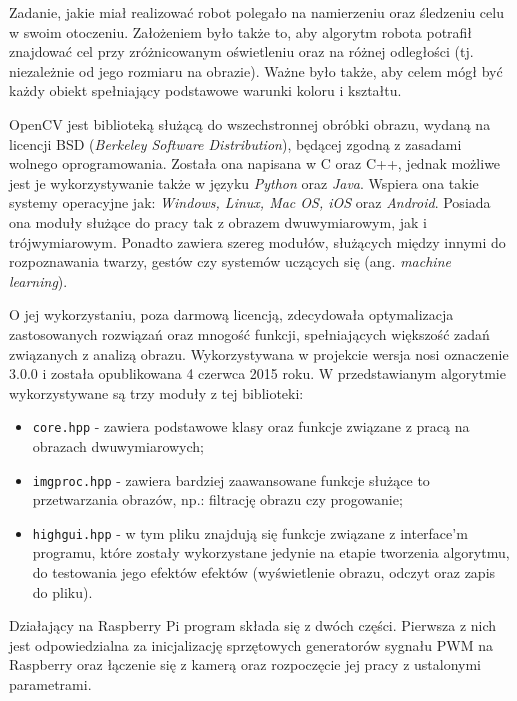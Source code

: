 Zadanie, jakie miał realizować robot polegało na namierzeniu oraz śledzeniu celu w swoim otoczeniu. Założeniem było także to, aby algorytm robota potrafił znajdować cel przy zróżnicowanym oświetleniu oraz na różnej odległości (tj. niezależnie od jego rozmiaru na obrazie). Ważne było także, aby celem mógł być każdy obiekt spełniający podstawowe warunki koloru i kształtu.

OpenCV jest biblioteką służącą do wszechstronnej obróbki obrazu, wydaną na licencji BSD (\textit{Berkeley Software Distribution}), będącej zgodną z zasadami wolnego oprogramowania. Została ona napisana w C oraz C++, jednak możliwe jest je wykorzystywanie także w języku \textit{Python} oraz \textit{Java}. Wspiera ona takie systemy operacyjne jak: \textit{Windows, Linux, Mac OS, iOS} oraz \textit{Android}. Posiada ona moduły służące do pracy tak z obrazem dwuwymiarowym, jak i trójwymiarowym. Ponadto zawiera szereg modułów, służących między innymi do rozpoznawania twarzy, gestów czy systemów uczących się (ang. \textit{machine learning}).

O jej wykorzystaniu, poza darmową licencją, zdecydowała optymalizacja zastosowanych rozwiązań oraz mnogość funkcji, spełniających większość zadań związanych z analizą obrazu. Wykorzystywana w projekcie wersja nosi oznaczenie 3.0.0 i została opublikowana 4 czerwca 2015 roku. W przedstawianym algorytmie wykorzystywane są trzy moduły z tej biblioteki:
\begin{itemize}
\item \texttt{core.hpp} - zawiera podstawowe klasy oraz funkcje związane z pracą na obrazach dwuwymiarowych;
\item \texttt{imgproc.hpp} - zawiera bardziej zaawansowane funkcje służące to przetwarzania obrazów, np.: filtrację obrazu czy progowanie;
\item \texttt{highgui.hpp} - w tym pliku znajdują się funkcje związane z interface'm programu, które zostały wykorzystane jedynie na etapie tworzenia algorytmu, do testowania jego efektów efektów (wyświetlenie obrazu, odczyt oraz zapis do pliku).
\end{itemize}

Działający na Raspberry Pi program składa się z dwóch części. Pierwsza z nich jest odpowiedzialna za inicjalizację sprzętowych generatorów sygnału PWM na Raspberry oraz łączenie się z kamerą oraz rozpoczęcie jej pracy z ustalonymi parametrami.

